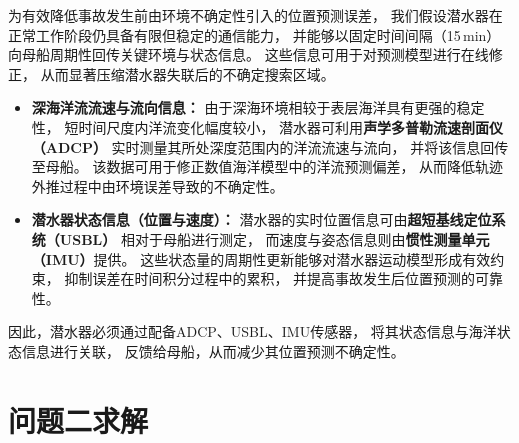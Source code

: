 \documentclass{mcmthesis}
\begin{document}
为有效降低事故发生前由环境不确定性引入的位置预测误差，
我们假设潜水器在正常工作阶段仍具备有限但稳定的通信能力，
并能够以固定时间间隔（15\,min）
向母船周期性回传关键环境与状态信息。
这些信息可用于对预测模型进行在线修正，
从而显著压缩潜水器失联后的不确定搜索区域。
\begin{itemize}
  \item \textbf{深海洋流流速与流向信息：}  
  由于深海环境相较于表层海洋具有更强的稳定性，
  短时间尺度内洋流变化幅度较小，
  潜水器可利用\textbf{声学多普勒流速剖面仪（ADCP）}
  实时测量其所处深度范围内的洋流流速与流向，
  并将该信息回传至母船。
  该数据可用于修正数值海洋模型中的洋流预测偏差，
  从而降低轨迹外推过程中由环境误差导致的不确定性。
  \item \textbf{潜水器状态信息（位置与速度）：}  
  潜水器的实时位置信息可由\textbf{超短基线定位系统（USBL）}
  相对于母船进行测定，
  而速度与姿态信息则由\textbf{惯性测量单元（IMU）}提供。
  这些状态量的周期性更新能够对潜水器运动模型形成有效约束，
  抑制误差在时间积分过程中的累积，
  并提高事故发生后位置预测的可靠性。
\end{itemize}
因此，潜水器必须通过配备ADCP、USBL、IMU传感器，
将其状态信息与海洋状态信息进行关联，
反馈给母船，从而减少其位置预测不确定性。

\section{问题二求解}
\end{document}
